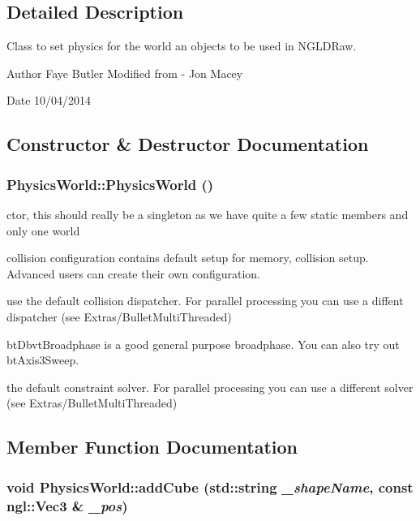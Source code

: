 \subsection{Detailed Description}
Class to set physics for the world an objects to be used in NGLDRaw. \begin{DoxyAuthor}{Author}
Faye Butler Modified from -\/ Jon Macey 
\end{DoxyAuthor}
\begin{DoxyDate}{Date}
10/04/2014 
\end{DoxyDate}


\subsection{Constructor \& Destructor Documentation}
\hypertarget{classPhysicsWorld_ae7aea476bf3c5d337a4fa5c1ff02f5d4}{
\subsubsection[{PhysicsWorld}]{\setlength{\rightskip}{0pt plus 5cm}PhysicsWorld::PhysicsWorld ()}}
\label{classPhysicsWorld_ae7aea476bf3c5d337a4fa5c1ff02f5d4}


ctor, this should really be a singleton as we have quite a few static members and only one world 

collision configuration contains default setup for memory, collision setup. Advanced users can create their own configuration.

use the default collision dispatcher. For parallel processing you can use a diffent dispatcher (see Extras/BulletMultiThreaded)

btDbvtBroadphase is a good general purpose broadphase. You can also try out btAxis3Sweep.

the default constraint solver. For parallel processing you can use a different solver (see Extras/BulletMultiThreaded) 

\subsection{Member Function Documentation}
\hypertarget{classPhysicsWorld_a780e7dba95f82c55de457f4dc4f942ec}{
\subsubsection[{addCube}]{\setlength{\rightskip}{0pt plus 5cm}void PhysicsWorld::addCube (std::string {\em \_\-shapeName}, \/  const ngl::Vec3 \& {\em \_\-pos})}}
\label{classPhysicsWorld_a780e7dba95f82c55de457f4dc4f942ec}


